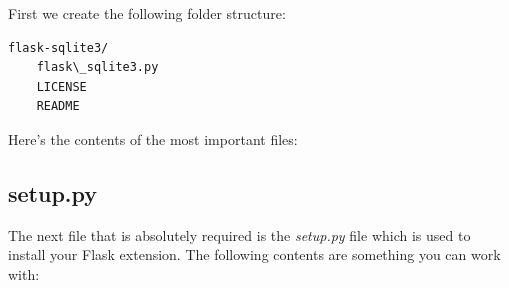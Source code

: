 \documentclass[a4paper,12pt]{sphinxmanual}
\begin{document}
First we create the following folder structure:

\begin{Verbatim}[commandchars=\\\{\}]
flask-sqlite3/
    flask\_sqlite3.py
    LICENSE
    README
\end{Verbatim}

Here's the contents of the most important files:


\subsection{setup.py}
\label{extensiondev:setup-py}
The next file that is absolutely required is the \emph{setup.py} file which is
used to install your Flask extension.  The following contents are
something you can work with:
\end{document}
